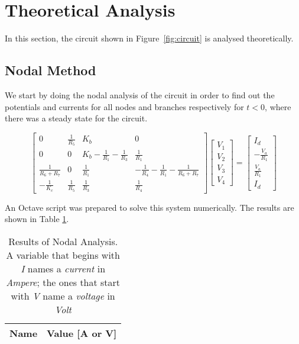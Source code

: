 \section{Theoretical Analysis}
\label{sec:analysis}

In this section, the circuit shown in Figure~\ref{fig:circuit} is analysed
theoretically.


\subsection{Nodal Method}

We start by doing the nodal analysis of the circuit in order to find out the potentials and currents for all nodes and branches respectively for $t < 0$, where there was a steady state for the circuit.



\[
  \begin{bmatrix}
    0                   & \frac{1}{R_5} & K_b                                 & 0                                              \\
    0                   & 0             & K_b - \frac{1}{R_1} - \frac{1}{R_3} & \frac{1}{R_1}                                  \\
    \frac{1}{R_6 + R_7} & 0             & \frac{1}{R_1}                       & -\frac{1}{R_4}-\frac{1}{R_1}-\frac{1}{R_6+R_7} \\
    -\frac{1}{K_c}      & \frac{1}{R_5} & \frac{1}{R_3}                       & \frac{1}{R_4}
  \end{bmatrix}
  \begin{bmatrix}
    V_1 \\ V_2 \\ V_3 \\ V_4
  \end{bmatrix}
  =
  \begin{bmatrix}
    I_d \\ -\frac{V_a}{R_1} \\ \frac{V_a}{R_1} \\ I_d
  \end{bmatrix}
\]

\hfill


An Octave script was prepared to solve this system numerically. The results are shown in Table \ref{tab:op_nodal_tab}.


\begin{table}[b]
  \centering
  \begin{tabular}{|l|r|}
    \hline
    {\bf Name} & {\bf Value [A or V]} \\ \hline
    
  \end{tabular}
  \caption{Results of Nodal Analysis. A variable that begins  with \textit{I} names a \textit{current} in \textit{Ampere}; the ones that start with \textit{V} name a \textit{voltage} in \textit{Volt} }
  \label{tab:op_nodal_tab}
\end{table}




